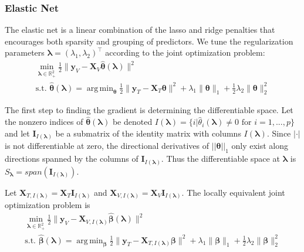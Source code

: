 \documentclass[12pt]{article}
\DeclareMathOperator*{\argmin}{arg\,min}
\begin{document}
\subsubsection{Elastic Net}\label{sec:enet}

The elastic net \citep{zou2003regression} is a linear combination of the lasso and ridge penalties that encourages both sparsity and grouping of predictors. We tune the regularization parameters $\boldsymbol{\lambda} = (\lambda_1, \lambda_2)^\top$ according to the joint optimization problem:
\begin{equation}
\begin{array}{c}
\min_{\boldsymbol{\lambda} \in \mathbb{R}^2_{+}} \frac{1}{2} \| \boldsymbol{y}_V - \boldsymbol{X}_V \hat{\boldsymbol{\theta}} (\boldsymbol \lambda) \| ^2 \\
\text{s.t. }
\hat{\boldsymbol{\theta}} (\boldsymbol{\lambda}) = \argmin_{\boldsymbol{\theta}} \frac{1}{2} \| \boldsymbol{y}_T - \boldsymbol{X}_T \boldsymbol{\theta} \| ^2
+ \lambda_1 \| \boldsymbol{\theta} \|_1
+ \frac{1}{2}\lambda_2 \| \boldsymbol{\theta} \|_2^2
\end{array}
\end{equation}

The first step to finding the gradient is determining the differentiable space. Let the nonzero indices of $\hat{\boldsymbol{\theta}}(\boldsymbol{\lambda})$ be denoted $I(\boldsymbol\lambda) = \{i | \hat{\theta}_i(\boldsymbol\lambda) \ne 0 \text{ for } i=1,...,p \}$ and let $\boldsymbol I_{I(\boldsymbol \lambda)}$ be a submatrix of the identity matrix with columns $I(\boldsymbol\lambda)$. Since $|\cdot|$ is not differentiable at zero, the directional derivatives of $||\boldsymbol \theta||_1$ only exist along directions spanned by the columns of $\boldsymbol I_{I(\boldsymbol \lambda)}$. Thus the differentiable space at $\boldsymbol \lambda$ is $S_{\boldsymbol{\lambda}} = span(\boldsymbol I_{I(\boldsymbol \lambda)})$.

Let $\boldsymbol{X}_{T, I(\boldsymbol\lambda)} = \boldsymbol{X}_T \boldsymbol{I}_{I(\boldsymbol \lambda)}$ and $\boldsymbol{X}_{V, I(\boldsymbol\lambda)}  = \boldsymbol{X}_V \boldsymbol{I}_{I(\boldsymbol \lambda)}$.  The locally equivalent joint optimization problem is
\begin{equation}
\begin{array}{c}
\min_{\boldsymbol{\lambda} \in \mathbb{R}^2_{+}} \frac{1}{2} \| \boldsymbol{y}_V - \boldsymbol{X}_{V, I(\boldsymbol \lambda)} \hat{\boldsymbol{\beta}} (\boldsymbol \lambda) \| ^2 \\
\text{s.t. }
\hat{\boldsymbol{\beta}} (\boldsymbol{\lambda}) = \argmin_{\boldsymbol \beta} \frac{1}{2} \| \boldsymbol{y}_T - \boldsymbol{X}_{T, I(\boldsymbol \lambda)} \boldsymbol \beta \| ^2
+ \lambda_1 \| \boldsymbol \beta \|_1
+ \frac{1}{2}\lambda_2 \| \boldsymbol \beta \|_2^2
\end{array}
\end{equation}
\end{document}
